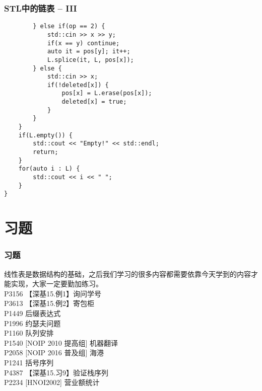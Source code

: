 \documentclass{beamer}
\begin{document}
\begin{frame}[fragile]
\frametitle{STL中的链表 -- III}
\begin{onlyenv}
\begin{verbatim}
        } else if(op == 2) {
            std::cin >> x >> y;
            if(x == y) continue;
            auto it = pos[y]; it++;
            L.splice(it, L, pos[x]);
        } else {
            std::cin >> x;
            if(!deleted[x]) {
                pos[x] = L.erase(pos[x]);
                deleted[x] = true;
            }
        }
    }
    if(L.empty()) {
        std::cout << "Empty!" << std::endl;
        return;
    }
    for(auto i : L) {
        std::cout << i << " ";
    }
}
\end{verbatim}
\end{onlyenv}
\end{frame}
\section{习题}
\begin{frame}
\frametitle{习题}
线性表是数据结构的基础，之后我们学习的很多内容都需要依靠今天学到的内容才能实现，大家一定要勤加练习。\\
P3156	【深基15.例1】询问学号\\ 
P3613	【深基15.例2】寄包柜	\\
P1449	后缀表达式	\\
P1996	约瑟夫问题 \\
P1160	队列安排	\\
P1540	[NOIP 2010 提高组] 机器翻译	\\
P2058	[NOIP 2016 普及组] 海港	\\
P1241	括号序列	\\	
P4387	【深基15.习9】验证栈序列	\\
P2234	[HNOI2002] 营业额统计 \\
\end{frame}
\end{document}
